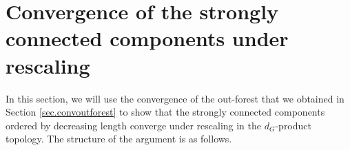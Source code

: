 \section{Convergence of the strongly connected components under rescaling}\label{sec.convSCCs}

In this section, we will use the convergence of the out-forest that we obtained in Section \ref{sec.convoutforest} to show that the strongly connected components ordered by decreasing length converge under rescaling in the $d_G$-product topology. The structure of the argument is as follows. 


